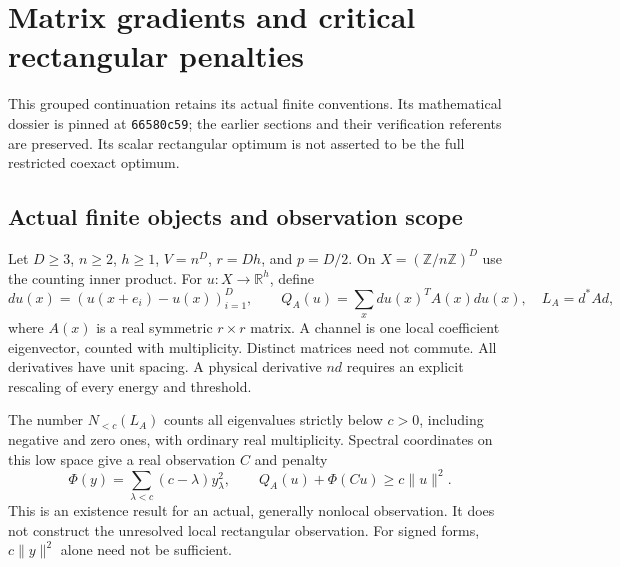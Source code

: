 \documentclass[11pt]{article}
\newcommand{\R}{\mathbb R}
\providecommand{\Nlow}{N_{<c}}
\begin{document}
\clearpage
\section{Matrix gradients and critical rectangular penalties}\label{sec:matrix-continuation}
This grouped continuation retains its actual finite conventions. Its mathematical dossier is pinned at \texttt{66580c59}; the earlier sections and their verification referents are preserved. Its scalar rectangular optimum is not asserted to be the full restricted coexact optimum.
\subsection{Actual finite objects and observation scope}
Let $D\geq3$, $n\geq2$, $h\geq1$, $V=n^D$, $r=Dh$, and $p=D/2$.
On $X=(\mathbb Z/n\mathbb Z)^D$ use the counting inner product. For
$u:X\to\R^h$, define
\[
 du(x)=(u(x+e_i)-u(x))_{i=1}^D,\qquad
 Q_A(u)=\sum_x du(x)^T A(x)du(x),\quad L_A=d^*A d,
\]
where $A(x)$ is a real symmetric $r\times r$ matrix. A channel is one local
coefficient eigenvector, counted with multiplicity. Distinct matrices need
not commute. All derivatives have unit spacing. A physical derivative $nd$
requires an explicit rescaling of every energy and threshold.

The number $\Nlow(L_A)$ counts all eigenvalues strictly below $c>0$,
including negative and zero ones, with ordinary real multiplicity. Spectral
coordinates on this low space give a real observation $C$ and penalty
\begin{equation}\label{mx:eq:penalty}
 \Phi(y)=\sum_{\lambda<c}(c-\lambda)y_\lambda^2,
 \qquad Q_A(u)+\Phi(Cu)\geq c\|u\|^2.
\end{equation}
This is an existence result for an actual, generally nonlocal observation.
It does not construct the unresolved local rectangular observation.
For signed forms, $c\|y\|^2$ alone need not be sufficient.
\end{document}
